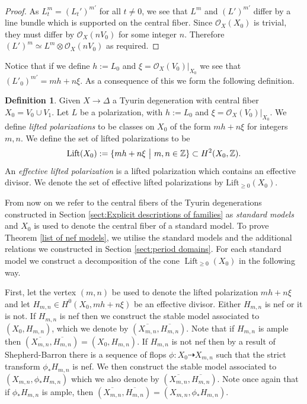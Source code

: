 \documentclass[a4paper]{amsart}
\theoremstyle{definition}
\newtheorem{defn}{Definition}[section]
\theoremstyle{plain}
\theoremstyle{remark}
\newcommand{\Z}{\mathbb{Z}}
\begin{document}
\begin{proof}
As $L_t^m=(L_t')^{m'}$ for all $t\neq0$, we see that $L^m$ and $(L')^{m'}$ differ by a line bundle which is supported on the central fiber. Since $\mathcal{O}_X(X_0)$ is trivial, they must differ by $\mathcal{O}_X(nV_0)$ for some integer $n$. Therefore $(L')^m\simeq L^m\otimes\mathcal{O}_X(nV_0)$ as required.
\end{proof}

Notice that if we define $h := L_0$ and $\xi=\mathcal{O}_X(V_0)|_{X_0}$ we see that $(L'_0)^{m'}=mh+n\xi$. As a consequence of this we form the following definition.

\begin{defn}
Given $X\rightarrow \Delta$ a Tyurin degeneration with central fiber $X_0 = V_0\cup V_1$. Let $L$ be a polarization, with $h:=L_0$ and $\xi = \mathcal{O}_X(V_0)|_{X_0}$. We define \emph{lifted polarizations} to be classes on $X_0$ of the form $mh+n\xi$ for integers $m,n$. We define the set of lifted polarizations to be $$\operatorname{Lift}(X_0):=\{mh+n\xi \text{ }\big{|} \text{ }m,n\in\Z\}\subset H^2(X_0,\Z).$$ An \emph{effective lifted polarization} is a lifted polarization which contains an effective divisor. We denote the set of effective lifted polarizations by $\operatorname{Lift_{\geq0}}(X_0)$.
\end{defn}

From now on we refer to the central fibers of the Tyurin degenerations constructed in Section \ref{sect:Explicit descriptions of families} as \emph{standard models} and $X_0$ is used to denote the central fiber of a standard model. To prove Theorem \ref{list of nef models}, we utilise the standard models and the additional relations we constructed in Section \ref{sect:period domains}. For each standard model we construct a decomposition of the cone $\operatorname{Lift}_{\geq0}(X_0)$ in the following way. 

First, let the vertex $(m,n)$ be used to denote the lifted polarization $mh+n\xi$ and let $H_{m,n}\in H^0(X_0,mh+n\xi)$ be an effective divisor. Either $H_{m,n}$ is nef or it is not. If $H_{m,n}$ is nef then we construct the stable model associated to $(X_0,H_{m,n})$, which we denote by $\left(\overline{X_{m,n}},\overline{H_{m,n}}\right)$. Note that if $H_{m,n}$ is ample then $\left(\overline{X_{m,n}},\overline{H_{m,n}}\right)=(X_0,H_{m,n})$. If $H_{m,n}$ is not nef then by a result of Shepherd-Barron \cite[Theorem 1]{SB83} there is a sequence of flops $\phi:X_0\dashrightarrow X_{m,n}$ such that the strict transform $\phi_*H_{m,n}$ is nef. We then construct the stable model associated to $(X_{m,n},\phi_*H_{m,n})$ which we also denote by $\left(\overline{X_{m,n}},\overline{H_{m,n}}\right)$. Note once again that if $\phi_*H_{m,n}$ is ample, then $\left(\overline{X_{m,n}},\overline{H_{m,n}}\right)=(X_{m,n},\phi_*H_{m,n})$. 
\end{document}
